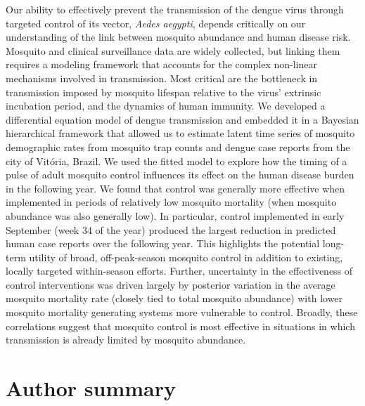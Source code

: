 \documentclass[10pt,letterpaper]{article}
\begin{document}
Our ability to effectively prevent the transmission of the dengue virus through targeted control of its vector, \emph{Aedes aegypti}, depends critically on our understanding of the link between mosquito abundance and human disease risk.
Mosquito and clinical surveillance data are widely collected, but linking them requires a modeling framework that accounts for the complex non-linear mechanisms involved in transmission.
Most critical are the bottleneck in transmission imposed by mosquito lifespan relative to the virus' extrinsic incubation period, and the dynamics of human immunity.
We developed a differential equation model of dengue transmission and embedded it in a Bayesian hierarchical framework that allowed us to estimate latent time series of mosquito demographic rates from mosquito trap counts and dengue case reports from the city of Vit\'oria, Brazil.
We used the fitted model to explore how the timing of a pulse of adult mosquito control influences its effect on the human disease burden in the following year.
We found that control was generally more effective when implemented in periods of relatively low mosquito mortality (when mosquito abundance was also generally low).
In particular, control implemented in early September (week 34 of the year) produced the largest reduction in predicted human case reports over the following year.
This highlights the potential long-term utility of broad, off-peak-season mosquito control in addition to existing, locally targeted within-season efforts.
Further, uncertainty in the effectiveness of control interventions was driven largely by posterior variation in the average mosquito mortality rate (closely tied to total mosquito abundance) with lower mosquito mortality generating systems more vulnerable to control.
Broadly, these correlations suggest that mosquito control is most effective in situations in which transmission is already limited by mosquito abundance.

\section*{Author summary}
\end{document}
